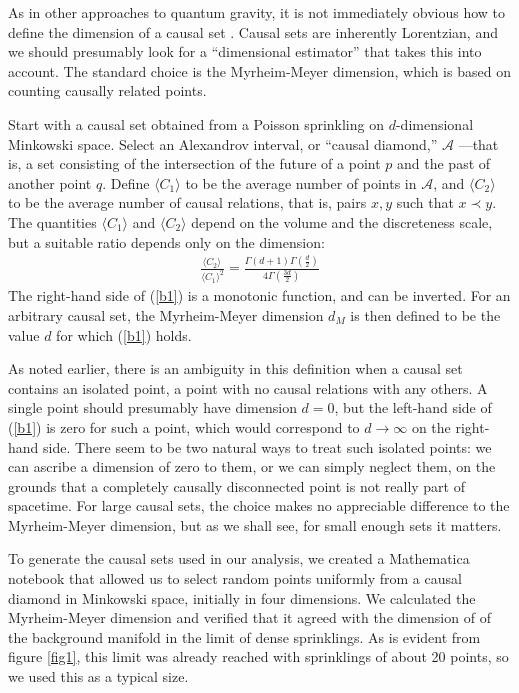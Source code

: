 \documentclass[12pt]{article}
\makeatletter
\def\section{\@startsection{section}{1}{\z@}{3.5ex plus 1ex minus
   .2ex}{2.3ex plus .2ex}{\large\bf}}
\makeatother
\begin{document}
As in other approaches to quantum gravity, it is not immediately obvious how to
define the dimension of a causal set .  Causal sets are inherently
Lorentzian, and we should presumably look for a ``dimensional estimator'' that
takes this into account.  The standard choice is the Myrheim-Meyer dimension,
which is based on counting causally related points.

Start with a causal set obtained from a Poisson sprinkling on $d$-dimensional
Minkowski space.  Select an Alexandrov interval, or ``causal diamond,'' $\mathcal{A}$%
---that is, a set consisting of the intersection of the future of a point $p$ and the past
of another point $q$.  Define $\langle C_1\rangle$ to be the average number of
points in $\mathcal{A}$, and $\langle C_2\rangle$ to be the average number of causal
relations, that is, pairs $x,y$ such that $x\prec y$.  The quantities $\langle C_1\rangle$
and $\langle C_2\rangle$ depend on the volume and the discreteness scale, but a
suitable ratio depends only on the dimension:
\begin{align}
\frac{\langle C_2\rangle\,}{\langle C_1\rangle^2} =
   \frac{\Gamma(d+1)\Gamma(\frac{d}{2})}{4\Gamma(\frac{3d}{2})}
\label{b1}
\end{align}
The right-hand side of (\ref{b1}) is a monotonic function, and can be inverted.
For an arbitrary causal set, the Myrheim-Meyer dimension $d_M$ is then defined to
be the value $d$ for which (\ref{b1}) holds.

As noted earlier, there is an ambiguity in this definition when a causal set contains an
isolated point, a point with no causal relations with any others.  A single point should
presumably have dimension $d=0$, but the left-hand side of (\ref{b1}) is zero for
such a point, which would correspond to $d\rightarrow\infty$ on the right-hand
side.  There seem to be two natural ways to treat such isolated points: we can ascribe
a dimension of zero to them, or we can simply neglect them, on the grounds that
a completely causally disconnected point is not really part of spacetime.  For large
causal sets, the choice  makes no appreciable difference to the Myrheim-Meyer
dimension, but as we shall see, for small enough sets it matters.

\section{Approach}

To generate the causal sets used in our analysis, we created a Mathematica notebook
 that allowed us to select random points uniformly from a causal diamond in
Minkowski space, initially in four dimensions.   We calculated the Myrheim-Meyer dimension
and verified that it agreed with the dimension of of the background manifold in the  limit
of dense sprinklings.  As is evident from figure \ref{fig1}, this limit was already reached
with sprinklings of about 20 points, so we used this as a typical size.
\end{document}
